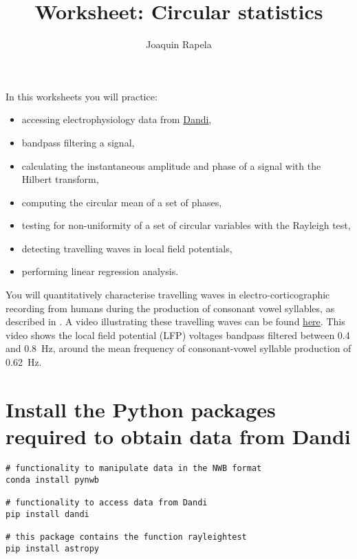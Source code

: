 \documentclass[12pt]{article}
\title{Worksheet: Circular statistics}
\author{Joaquin Rapela}
\begin{document}
\maketitle

In this worksheets you will practice:

\begin{itemize}

    \item accessing electrophysiology data from
        \href{https://dandiarchive.org/}{Dandi},

    \item bandpass filtering a signal,

    \item calculating the instantaneous amplitude and phase of a signal with
        the Hilbert transform,

    \item computing the circular mean of a set of phases,

    \item testing for non-uniformity of a set of circular variables with the
        Rayleigh test,

    \item detecting travelling waves in local field potentials,

    \item performing linear regression analysis.

\end{itemize}

You will quantitatively characterise travelling waves in electro-corticographic
recording from humans during the production of consonant vowel syllables, as
described in
\citet{rapelaInPrepTWsInSpeech,rapelaInPrepSyncTWs,rapelaInPrepSyncTWsII}. A
video illustrating these travelling waves can be found
\href{https://www.youtube.com/watch?v=6QYUGRqZ7Hc}{here}. This video shows the
local field potential (LFP) voltages bandpass filtered between 0.4 and 0.8~Hz,
around the mean frequency of consonant-vowel syllable production of 0.62~Hz.

\section{Install the Python packages required to obtain data from Dandi}

\begin{verbatim}
# functionality to manipulate data in the NWB format
conda install pynwb

# functionality to access data from Dandi
pip install dandi

# this package contains the function rayleightest
pip install astropy

\end{verbatim}
\end{document}
